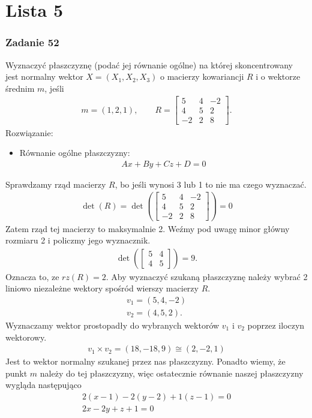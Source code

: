 \chapter*{Lista 5}


\subsection*{Zadanie 52}
Wyznaczyć płaszczyznę (podać jej równanie ogólne) na której skoncentrowany jest normalny wektor $ X=(X_1,X_2,X_3) $ o macierzy kowariancji $ R $ i o wektorze średnim $ m $, jeśli
\begin{gather*}
m=(1,2,1),\qquad
R=
\begin{bmatrix}
	5  & 4 & -2 \\
	4  & 5 & 2  \\
	-2 & 2 & 8
\end{bmatrix}.
\end{gather*}
Rozwiązanie:
\begin{itemize}
\item Równanie ogólne płaszczyzny:
\begin{gather*}
Ax+By+Cz+D=0
\end{gather*}
\end{itemize}
Sprawdzamy rząd macierzy $ R $, bo jeśli wynosi 3 lub 1 to nie ma czego wyznaczać.
\begin{gather*}
\det(R)=
\det\left(
\begin{bmatrix}
	5  & 4 & -2 \\
	4  & 5 & 2  \\
	-2 & 2 & 8
\end{bmatrix}
\right)=0
\end{gather*}
Zatem rząd tej macierzy to maksymalnie 2. Weźmy pod uwagę minor główny rozmiaru 2 i policzmy jego wyznacznik.
\begin{gather*}
\det \left(
\begin{bmatrix}
	5 & 4 \\
	4 & 5
\end{bmatrix}
\right)=
9.
\end{gather*}
Oznacza to, ze $ rz(R)=2 $. Aby wyznaczyć szukaną płaszczyznę należy wybrać 2 liniowo niezależne wektory spośród wierszy macierzy $ R $.
\begin{gather*}
v_1=\left(5,4,-2\right)\\
v_2=\left(4,5,2\right).
\end{gather*}
Wyznaczamy wektor prostopadły do wybranych wektorów $ v_1 $ i $ v_2 $ poprzez iloczyn wektorowy.
\begin{gather*}
v_1\times v_2=\left(18, -18, 9\right)\cong \left(2, -2, 1\right)
\end{gather*}
Jest to wektor normalny szukanej przez nas płaszczyzny. Ponadto wiemy, że punkt $ m $ należy do tej płaszczyzny, więc ostatecznie równanie naszej płaszczyzny wygląda następująco
\begin{gather*}
2 (x - 1) - 2 (y - 2) + 1 (z - 1)=0\\
2 x-2 y+z+1=0
\end{gather*}


